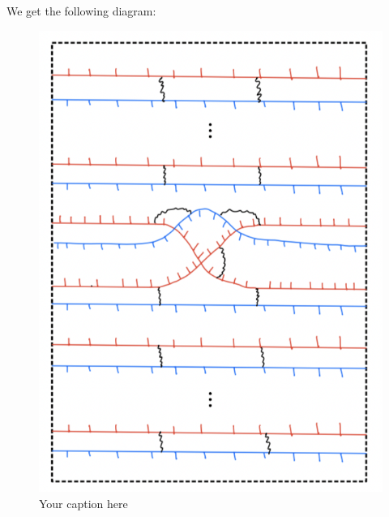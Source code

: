 We get the following diagram:
\begin{figure}[H] %
    \centering
    \includegraphics[width=\linewidth]{diagrams/theorem12/4.png} %
    \caption{Your caption here}
    \label{fig:your-label}
\end{figure}

